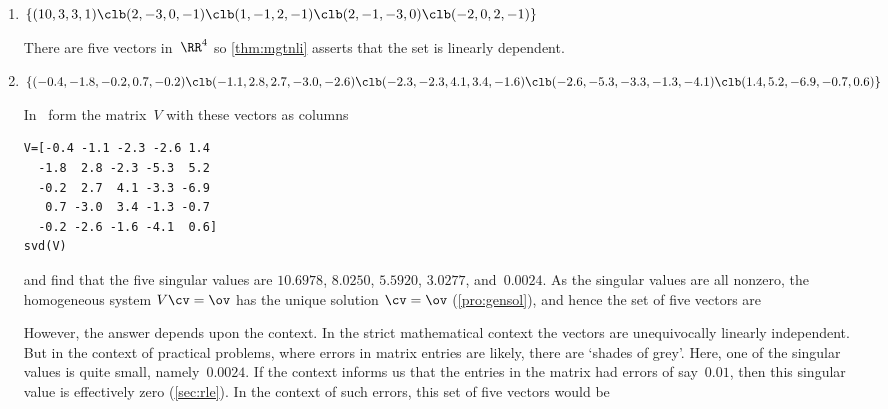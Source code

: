 \begin{example}
\begin{enumerate}
\item \(\{(10,3,3,1)\clb ( 2,-3,0,-1)\clb ( 1,-1,2,-1)\clb ( 2,-1,-3,0)\clb (-2,0,2,-1)\}\)
\begin{solution} 
There are five vectors in~\(\RR^4\) so \cref{thm:mgtnli} asserts that the set is linearly dependent.
\end{solution}




\item \(\sloppy\{(-0.4,-1.8,-0.2, 0.7,-0.2)\clb (-1.1, 2.8, 2.7,-3.0,-2.6)\clb (-2.3,-2.3, 4.1, 3.4,-1.6)\clb (-2.6,-5.3,-3.3,-1.3,-4.1)\clb ( 1.4, 5.2,-6.9,-0.7, 0.6)\}\)
\begin{solution} 
In \script\ form the matrix~\(V\) with these vectors as columns
\begin{verbatim}
V=[-0.4 -1.1 -2.3 -2.6 1.4
  -1.8  2.8 -2.3 -5.3  5.2
  -0.2  2.7  4.1 -3.3 -6.9
   0.7 -3.0  3.4 -1.3 -0.7
  -0.2 -2.6 -1.6 -4.1  0.6]
svd(V)
\end{verbatim}
\setbox\ajrqrbox\hbox{}%
\marginajrbox%
and find that the five singular values are \(10.6978\), \(8.0250\), \(5.5920\), \(3.0277\), and~\(0.0024\).
As the singular values are all nonzero, the homogeneous system \(V\cv=\ov\) has the unique solution \(\cv=\ov\) (\cref{pro:gensol}), and hence the set of five vectors are 

However, the answer depends upon the context.  
In the strict mathematical context the vectors are unequivocally linearly independent.
But in the context of practical problems, where errors in matrix entries are likely, there are `shades of grey'. 
Here, one of the singular values is quite small, namely~\(0.0024\).
If the context informs us that the entries in the matrix had errors of say~\(0.01\), then this singular value is effectively zero (\cref{sec:rle}).
In the context of such errors, this set of five vectors would be  
\end{solution}


\end{enumerate}
\end{example}













